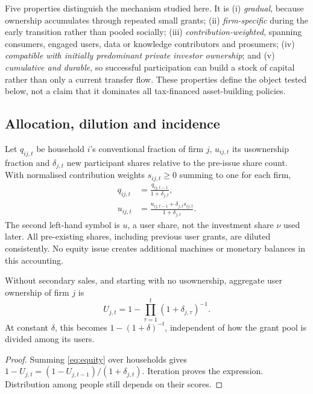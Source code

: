 Five properties distinguish the mechanism studied here. It is (i) \emph{gradual}, because ownership accumulates through repeated small grants; (ii) \emph{firm-specific} during the early transition rather than pooled socially; (iii) \emph{contribution-weighted}, spanning consumers, engaged users, data or knowledge contributors and prosumers; (iv) \emph{compatible with initially predominant private investor ownership}; and (v) \emph{cumulative and durable}, so successful participation can build a stock of capital rather than only a current transfer flow. These properties define the object tested below, not a claim that it dominates all tax-financed asset-building policies.

\begin{table}[htbp]\centering\small
\caption{Terminological boundary of usownership}

\end{table}

\subsection{Allocation, dilution and incidence}
Let $q_{ij,t}$ be household $i$'s conventional fraction of firm $j$, $u_{ij,t}$ its usownership fraction and $\delta_{j,t}$ new participant shares relative to the pre-issue share count. With normalised contribution weights $s_{ij,t}\geq0$ summing to one for each firm,
\begin{align}
q_{ij,t}&=\frac{q_{ij,t-1}}{1+\delta_{j,t}},\\
u_{ij,t}&=\frac{u_{ij,t-1}+\delta_{j,t}s_{ij,t}}{1+\delta_{j,t}}.\label{eq:equity}
\end{align}
The second left-hand symbol is $u$, a user share, not the investment share $\nu$ used later. All pre-existing shares, including previous user grants, are diluted consistently. No equity issue creates additional machines or monetary balances in this accounting.

\begin{proposition}\label{prop:accumulation}
Without secondary sales, and starting with no usownership, aggregate user ownership of firm $j$ is
\begin{equation}
U_{j,t}=1-\prod_{\tau=1}^{t}(1+\delta_{j,\tau})^{-1}.\label{eq:U}
\end{equation}
At constant $\delta$, this becomes $1-(1+\delta)^{-t}$, independent of how the grant pool is divided among its users.
\end{proposition}
\begin{proof}
Summing \eqref{eq:equity} over households gives $1-U_{j,t}=(1-U_{j,t-1})/(1+\delta_{j,t})$. Iteration proves the expression. Distribution among people still depends on their scores.
\end{proof}

